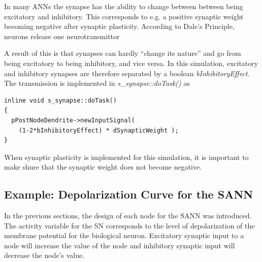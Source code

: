 	In many ANNs the synapse has the ability to change between between being excitatory and inhibitory. 
	This corresponds to e.g. a positive synaptic weight becoming negative after synaptic plasticity.
	According to Dale's Principle, neurons release one neurotransmittor\cite{NeuroscienceExploringTheBrain3edKAP6}

	A result of this is that synapses can hardly ``change its nature'' and go from being excitatory to being inhibitory, and vice versa.
	In this simulation, excitatory and inhibitory synapses are therefore separated by a boolean \emph{bInhibitoryEffect}. 
	The transmission is implemented in \emph{s\_synapse::doTask()} as
\begin{lstlisting}
inline void s_synapse::doTask()
{
  pPostNodeDendrite->newInputSignal( 
    (1-2*bInhibitoryEffect) * dSynapticWeight );
}
\end{lstlisting}

	When synaptic plasticity is implemented for this simulation, it is important to make shure that the synaptic weight does not become negative. 

\subsection{Example: Depolarization Curve for the SANN}
	In the previous sections, the design of each node for the SANN was introduced.
	The activity variable for the SN corresponds to the level of depolarization of the membrane potential for the biological neuron.
	Excitatory synaptic input to a node will increase the value of the node and inhibitory synaptic input will decrease the node's value.

